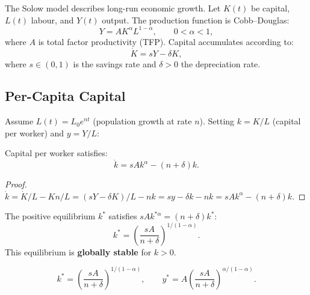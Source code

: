 \begin{definition}
The Solow model describes long-run economic growth.  Let $K(t)$ be
capital, $L(t)$ labour, and $Y(t)$ output.  The production function
is Cobb--Douglas:
\[
  Y = AK^\alpha L^{1-\alpha}, \qquad 0<\alpha<1,
\]
where $A$ is total factor productivity (TFP).  Capital accumulates
according to:
\[
  \dot{K} = sY - \delta K,
\]
where $s\in(0,1)$ is the savings rate and $\delta>0$ the depreciation
rate.
\end{definition}

\subsection{Per-Capita Capital}

Assume $L(t)=L_0 e^{nt}$ (population growth at rate $n$).  Setting
$k=K/L$ (capital per worker) and $y=Y/L$:

\begin{theorem}
Capital per worker satisfies:
\[
  \dot{k} = sAk^\alpha - (n+\delta)k.
\]
\end{theorem}

\begin{proof}
$\dot{k} = \dot{K}/L - Kn/L = (sY-\delta K)/L - nk
= sy - \delta k - nk = sAk^\alpha - (n+\delta)k$.
\end{proof}

\begin{proposition}
The positive equilibrium $k^*$ satisfies $sAk^{*\alpha}=(n+\delta)k^*$:
\[
  k^* = \left(\frac{sA}{n+\delta}\right)^{1/(1-\alpha)}.
\]
This equilibrium is \textbf{globally stable} for $k>0$.
\end{proposition}

\begin{keyformulas}[title=\textbf{Solow equilibrium}]
\[
  k^* = \left(\frac{sA}{n+\delta}\right)^{1/(1-\alpha)}, \qquad
  y^* = A\left(\frac{sA}{n+\delta}\right)^{\alpha/(1-\alpha)}.
\]
\end{keyformulas}


